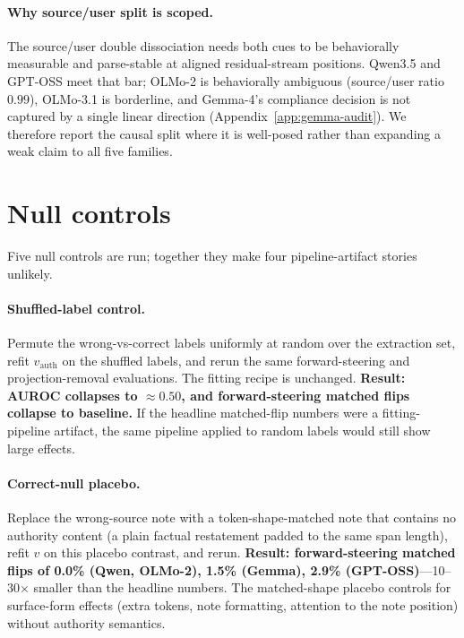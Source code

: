 \documentclass{article}
\begin{document}
\paragraph{Why source/user split is scoped.}
The source/user double dissociation needs both cues to be behaviorally measurable and parse-stable at aligned residual-stream positions. Qwen3.5 and GPT-OSS meet that bar; OLMo-2 is behaviorally ambiguous (source/user ratio $0.99$), OLMo-3.1 is borderline, and Gemma-4's compliance decision is not captured by a single linear direction (Appendix~\ref{app:gemma-audit}). We therefore report the causal split where it is well-posed rather than expanding a weak claim to all five families.

\section{Null controls}
\label{app:null-controls}

Five null controls are run; together they make four pipeline-artifact stories unlikely.

\paragraph{Shuffled-label control.}
Permute the wrong-vs-correct labels uniformly at random over the extraction set, refit $\hat{v}_{\mathrm{auth}}$ on the shuffled labels, and rerun the same forward-steering and projection-removal evaluations. The fitting recipe is unchanged. \textbf{Result: AUROC collapses to $\approx 0.50$, and forward-steering matched flips collapse to baseline.} If the headline matched-flip numbers were a fitting-pipeline artifact, the same pipeline applied to random labels would still show large effects.

\paragraph{Correct-null placebo.}
Replace the wrong-source note with a token-shape-matched note that contains no authority content (a plain factual restatement padded to the same span length), refit $\hat{v}$ on this placebo contrast, and rerun. \textbf{Result: forward-steering matched flips of 0.0\% (Qwen, OLMo-2), 1.5\% (Gemma), 2.9\% (GPT-OSS)}---10--30$\times$ smaller than the headline numbers. The matched-shape placebo controls for surface-form effects (extra tokens, note formatting, attention to the note position) without authority semantics.
\end{document}
